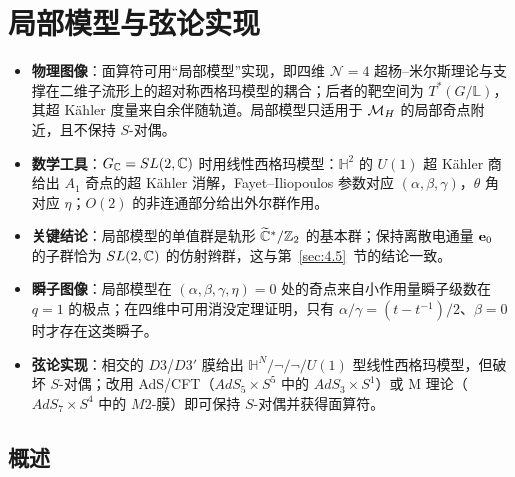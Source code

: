 

\section{局部模型与弦论实现}

\label{sec:6}

\begin{keytakeaways}
  \begin{itemize}[leftmargin=1.4em,itemsep=2pt,topsep=2pt]
    \item \textbf{物理图像}：面算符可用“局部模型”实现，即四维 ${\mathcal N}=4$ 超杨–米尔斯理论与支撑在二维子流形上的超对称西格玛模型的耦合；后者的靶空间为 $T^*(G/\mathbb{L})$，其超 Kähler 度量来自余伴随轨道。局部模型只适用于 ${{\mathcal{M}}_H}$ 的局部奇点附近，且不保持 $S$-对偶。
    \item \textbf{数学工具}：$G_{\mathbb{C}}=SL(2,{\mathbb{C}})$ 时用线性西格玛模型：$\mathbb{H}^2$ 的 $U(1)$ 超 Kähler 商给出 $A_1$ 奇点的超 Kähler 消解，Fayet–Iliopoulos 参数对应 $(\alpha,\beta,\gamma)$，$\theta$ 角对应 $\eta$；$O(2)$ 的非连通部分给出外尔群作用。
    \item \textbf{关键结论}：局部模型的单值群是轨形 $\widetilde{{\mathbb{C}}}^*/{\mathbb{Z}}_2$ 的基本群；保持离散电通量 ${\bf e}_0$ 的子群恰为 $SL(2,{\mathbb{C}})$ 的仿射辫群，这与第~\ref{sec:4.5}~节的结论一致。
    \item \textbf{瞬子图像}：局部模型在 $(\alpha,\beta,\gamma,\eta)=0$ 处的奇点来自小作用量瞬子级数在 $q=1$ 的极点；在四维中可用消没定理证明，只有 $\alpha/\gamma=(t-t^{-1})/2$、$\beta=0$ 时才存在这类瞬子。
    \item \textbf{弦论实现}：相交的 $D3$/$D3'$ 膜给出 $\mathbb{H}^N/\neg/\neg/U(1)$ 型线性西格玛模型，但破坏 $S$-对偶；改用 AdS/CFT（$AdS_5\times S^5$ 中的 $AdS_3\times S^1$）或 M 理论（$AdS_7\times S^4$ 中的 $M2$-膜）即可保持 $S$-对偶并获得面算符。
  \end{itemize}
\end{keytakeaways}


\subsection{概述}
\label{sec:6.1}

